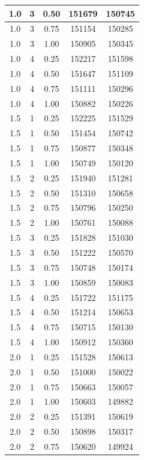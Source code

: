\documentclass{article}
\begin{document}
\begin{longtable}[htbp]{|c|c|c|c|c|}
    1.0 & 3 & 0.50 & 151679 & 150745 \\ \hline
    1.0 & 3 & 0.75 & 151154 & 150285 \\ \hline
    1.0 & 3 & 1.00 & 150905 & 150345 \\ \hline
    1.0 & 4 & 0.25 & 152217 & 151598 \\ \hline
    1.0 & 4 & 0.50 & 151647 & 151109 \\ \hline
    1.0 & 4 & 0.75 & 151111 & 150296 \\ \hline
    1.0 & 4 & 1.00 & 150882 & 150226 \\ \hline
    1.5 & 1 & 0.25 & 152225 & 151529 \\ \hline
    1.5 & 1 & 0.50 & 151454 & 150742 \\ \hline
    1.5 & 1 & 0.75 & 150877 & 150348 \\ \hline
    1.5 & 1 & 1.00 & 150749 & 150120 \\ \hline
    1.5 & 2 & 0.25 & 151940 & 151281 \\ \hline
    1.5 & 2 & 0.50 & 151310 & 150658 \\ \hline
    1.5 & 2 & 0.75 & 150796 & 150250 \\ \hline
    1.5 & 2 & 1.00 & 150761 & 150088 \\ \hline
    1.5 & 3 & 0.25 & 151828 & 151030 \\ \hline
    1.5 & 3 & 0.50 & 151222 & 150570 \\ \hline
    1.5 & 3 & 0.75 & 150748 & 150174 \\ \hline
    1.5 & 3 & 1.00 & 150859 & 150083 \\ \hline
    1.5 & 4 & 0.25 & 151722 & 151175 \\ \hline
    1.5 & 4 & 0.50 & 151214 & 150653 \\ \hline
    1.5 & 4 & 0.75 & 150715 & 150130 \\ \hline
    1.5 & 4 & 1.00 & 150912 & 150360 \\ \hline
    2.0 & 1 & 0.25 & 151528 & 150613 \\ \hline
    2.0 & 1 & 0.50 & 151000 & 150022 \\ \hline
    2.0 & 1 & 0.75 & 150663 & 150057 \\ \hline
    2.0 & 1 & 1.00 & 150603 & 149882 \\ \hline
    2.0 & 2 & 0.25 & 151391 & 150619 \\ \hline
    2.0 & 2 & 0.50 & 150898 & 150317 \\ \hline
    2.0 & 2 & 0.75 & 150620 & 149924 \\ \hline

\end{longtable}
\end{document}
